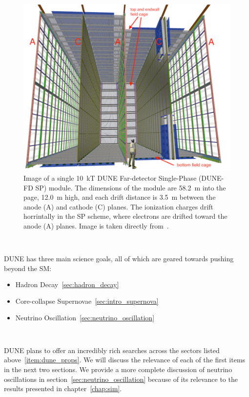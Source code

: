 \begin{figure}[]
\centering
\includegraphics[width=\textwidth]{images/dune_fd_10ktmodule_tdrv1.png}
\caption{Image of a single 10~\unit{kT} DUNE Far-detector Single-Phase (DUNE-FD SP) module.
The dimensions of the module are 58.2~\unit{m} into the page, 12.0~\unit{m} high, and each drift distance is 3.5~\unit{m} between the anode (A) and cathode (C) planes. 
The ionization charges drift horrintally in the SP scheme, where electrons are drifted toward the anode (A) planes.
Image is taken directly from~\citep{DUNE_TDR_V1_Abi_2020}.
}
\end{figure}~\label{fig:dune_10kt}


DUNE has three main science goals, all of which are geared towards pushing beyond the SM:

\begin{itemize}
    \item Hadron Decay~\ref{sec:hadron_decay}
    \item Core-collapse Supernovae~\ref{sec:intro_supernova}
    \item Neutrino Oscillation~\ref{sec:neutrino_oscillation}
\end{itemize}
~\label{item:dune_props}

DUNE plans to offer an incredibly rich searches across the sectors listed above~\ref{item:dune_props}.
We will discuss the relevance of each of the first items in the next two sections.
We provide a more complete discussion of neutrino oscillations in section~\ref{sec:neutrino_oscillation} because of its relevance to the results presented in chapter~\ref{chap:sim}.


